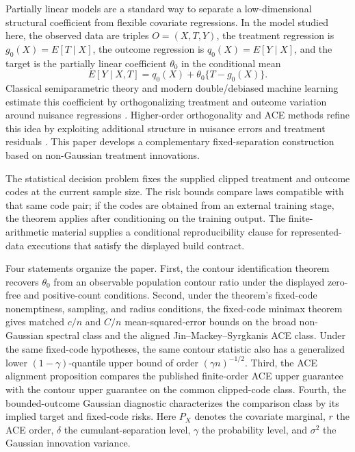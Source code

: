 Partially linear models are a standard way to separate a low-dimensional structural coefficient from flexible covariate regressions. In the model studied here, the observed data are triples \(O=(X,T,Y)\), the treatment regression is \(g_0(X)=E[T\mid X]\), the outcome regression is \(q_0(X)=E[Y\mid X]\), and the target is the partially linear coefficient \(\theta_0\) in the conditional mean
\[
E[Y\mid X,T]=q_0(X)+\theta_0\{T-g_0(X)\}.
\]
Classical semiparametric theory and modern double/debiased machine learning estimate this coefficient by orthogonalizing treatment and outcome variation around nuisance regressions \citep{Robinson1988,Newey1990,Newey1994,NeweyMcFadden1994,BickelKlaassenRitovWellner1993,VanDerVaart1998,VanDerVaartWellner1996,BelloniChernozhukovHansen2014,ChernozhukovEtAl2018DML}. Higher-order orthogonality and ACE methods refine this idea by exploiting additional structure in nuisance errors and treatment residuals \citep{RobinsLiTchetgenVanDerVaart2008,LiuMukherjeeNeweyRobins2017,NeweyRobins2018,LiuMukherjeeRobinsTchetgen2021,MackeySyrgkanisZadik2018,JinMackeySyrgkanis2025}. This paper develops a complementary fixed-separation construction based on non-Gaussian treatment innovations.

The statistical decision problem fixes the supplied clipped treatment and outcome codes at the current sample size. The risk bounds compare laws compatible with that same code pair; if the codes are obtained from an external training stage, the theorem applies after conditioning on the training output. The finite-arithmetic material supplies a conditional reproducibility clause for represented-data executions that satisfy the displayed build contract.

Four statements organize the paper. First, the contour identification theorem recovers \(\theta_0\) from an observable population contour ratio under the displayed zero-free and positive-count conditions. Second, under the theorem's fixed-code nonemptiness, sampling, and radius conditions, the fixed-code minimax theorem gives matched \(c/n\) and \(C/n\) mean-squared-error bounds on the broad non-Gaussian spectral class and the aligned Jin--Mackey--Syrgkanis ACE class. Under the same fixed-code hypotheses, the same contour statistic also has a generalized lower \((1-\gamma)\)-quantile upper bound of order \((\gamma n)^{-1/2}\). Third, the ACE alignment proposition compares the published finite-order ACE upper guarantee with the contour upper guarantee on the common clipped-code class. Fourth, the bounded-outcome Gaussian diagnostic characterizes the comparison class by its implied target and fixed-code risks. Here \(P_X\) denotes the covariate marginal, \(r\) the ACE order, \(\delta\) the cumulant-separation level, \(\gamma\) the probability level, and \(\sigma^2\) the Gaussian innovation variance.

